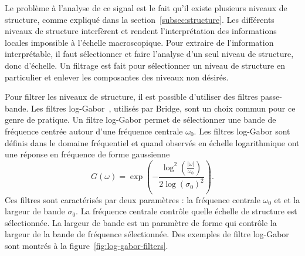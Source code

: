 Le problème à l'analyse de ce signal est le fait qu'il existe plusieurs niveaux de structure, comme expliqué dans la section~\ref{subsec:structure}. Les différents niveaux de structure interfèrent et rendent l'interprétation des informations locales impossible à l'échelle macroscopique. Pour extraire de l'information interprétable, il faut sélectionner et faire l'analyse d'un seul niveau de structure, donc d'échelle. Un filtrage est fait pour sélectionner un niveau de structure en particulier et enlever les composantes des niveaux non désirés. 

\bigskip

Pour filtrer les niveaux de structure, il est possible d'utiliser des filtres passe-bande. Les filtres log-Gabor~\cite{field_relations_1987}, utilisés par Bridge, sont un choix commun pour ce genre de pratique. Un filtre log-Gabor permet de sélectionner une bande de fréquence centrée autour d'une fréquence centrale $\omega_0$. Les filtres log-Gabor sont définis dans le domaine fréquentiel et quand observés en échelle logarithmique ont une réponse en fréquence de forme gaussienne
\begin{equation}
    G(\omega) = \exp\left(-\frac{\log^2(\frac{|\omega|}{\omega_0})}{2\log(\sigma_0)^2}\right).
\end{equation}
Ces filtres sont caractérisés par deux paramètres : la fréquence centrale $\omega_0$ et et la largeur de bande $\sigma_0$. La fréquence centrale contrôle quelle échelle de structure est sélectionnée. La largeur de bande est un paramètre de forme qui contrôle la largeur de la bande de fréquence sélectionnée. Des exemples de filtre log-Gabor sont montrés à la figure~\ref{fig:log-gabor-filters}.

\bigskip


